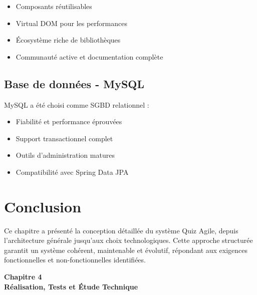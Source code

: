 \documentclass[12pt,a4paper]{report}
\begin{document}
\begin{itemize}
    \item Composants réutilisables
    \item Virtual DOM pour les performances
    \item Écosystème riche de bibliothèques
    \item Communauté active et documentation complète
\end{itemize}

\subsection{Base de données - MySQL}

MySQL a été choisi comme SGBD relationnel :

\begin{itemize}
    \item Fiabilité et performance éprouvées
    \item Support transactionnel complet
    \item Outils d'administration matures
    \item Compatibilité avec Spring Data JPA
\end{itemize}

\section{Conclusion}

Ce chapitre a présenté la conception détaillée du système Quiz Agile, depuis l'architecture générale jusqu'aux choix technologiques. Cette approche structurée garantit un système cohérent, maintenable et évolutif, répondant aux exigences fonctionnelles et non-fonctionnelles identifiées.


\cleardoublepage
\thispagestyle{empty}
\begin{center}
    \vspace*{4cm}
    {\Huge \textbf{Chapitre 4}}\\[1.5cm]
    {\LARGE \textbf{Réalisation, Tests et Étude Technique}}
\end{center}
\cleardoublepage

\setcounter{section}{0}
\end{document}
